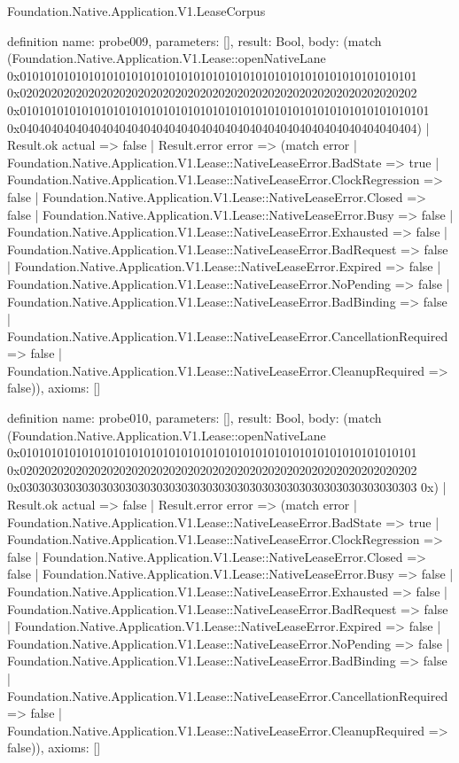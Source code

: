 \begin{lexlean}{Foundation.Native.Application.V1.LeaseCorpus}
\begin{semanticmodule}
definition{
  name: probe009,
  parameters: [],
  result: Bool,
  body: (match (Foundation.Native.Application.V1.Lease::openNativeLane 0x0101010101010101010101010101010101010101010101010101010101010101 0x0202020202020202020202020202020202020202020202020202020202020202 0x010101010101010101010101010101010101010101010101010101010101010101 0x0404040404040404040404040404040404040404040404040404040404040404)
    | Result.ok actual => false
    | Result.error error => (match error
      | Foundation.Native.Application.V1.Lease::NativeLeaseError.BadState => true
      | Foundation.Native.Application.V1.Lease::NativeLeaseError.ClockRegression => false
      | Foundation.Native.Application.V1.Lease::NativeLeaseError.Closed => false
      | Foundation.Native.Application.V1.Lease::NativeLeaseError.Busy => false
      | Foundation.Native.Application.V1.Lease::NativeLeaseError.Exhausted => false
      | Foundation.Native.Application.V1.Lease::NativeLeaseError.BadRequest => false
      | Foundation.Native.Application.V1.Lease::NativeLeaseError.Expired => false
      | Foundation.Native.Application.V1.Lease::NativeLeaseError.NoPending => false
      | Foundation.Native.Application.V1.Lease::NativeLeaseError.BadBinding => false
      | Foundation.Native.Application.V1.Lease::NativeLeaseError.CancellationRequired => false
      | Foundation.Native.Application.V1.Lease::NativeLeaseError.CleanupRequired => false)),
  axioms: []
}

definition{
  name: probe010,
  parameters: [],
  result: Bool,
  body: (match (Foundation.Native.Application.V1.Lease::openNativeLane 0x0101010101010101010101010101010101010101010101010101010101010101 0x0202020202020202020202020202020202020202020202020202020202020202 0x0303030303030303030303030303030303030303030303030303030303030303 0x)
    | Result.ok actual => false
    | Result.error error => (match error
      | Foundation.Native.Application.V1.Lease::NativeLeaseError.BadState => true
      | Foundation.Native.Application.V1.Lease::NativeLeaseError.ClockRegression => false
      | Foundation.Native.Application.V1.Lease::NativeLeaseError.Closed => false
      | Foundation.Native.Application.V1.Lease::NativeLeaseError.Busy => false
      | Foundation.Native.Application.V1.Lease::NativeLeaseError.Exhausted => false
      | Foundation.Native.Application.V1.Lease::NativeLeaseError.BadRequest => false
      | Foundation.Native.Application.V1.Lease::NativeLeaseError.Expired => false
      | Foundation.Native.Application.V1.Lease::NativeLeaseError.NoPending => false
      | Foundation.Native.Application.V1.Lease::NativeLeaseError.BadBinding => false
      | Foundation.Native.Application.V1.Lease::NativeLeaseError.CancellationRequired => false
      | Foundation.Native.Application.V1.Lease::NativeLeaseError.CleanupRequired => false)),
  axioms: []
}


\end{semanticmodule}
\end{lexlean}
